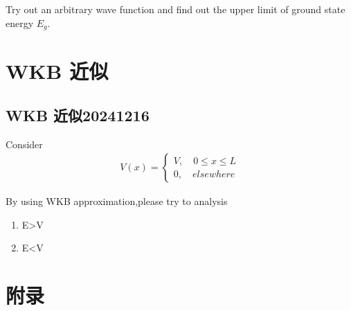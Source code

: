 \documentclass{article}
\begin{document}
Try out an arbitrary wave function and find out the upper limit of ground state energy $E_g$.


\section{WKB 近似}
\subsection{WKB 近似20241216}
Consider 
\begin{align*}
    V(x)=
    \begin{cases}
        V,\quad 0\leq x\leq L\\
        0,\quad elsewhere
    \end{cases}
\end{align*}

By using WKB approximation,please try to analysis 
\begin{enumerate}
    \item E>V
    \item E<V
\end{enumerate}
























\newpage
\section{附录}
\end{document}
